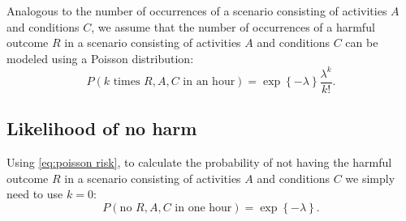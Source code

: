 Analogous to the number of occurrences of a scenario consisting of activities $A$ and conditions $C$, we assume that the number of occurrences of a harmful outcome $R$ in a scenario consisting of activities $A$ and conditions $C$ can be modeled using a Poisson distribution:
\begin{equation} \label{eq:poisson risk}
	P(k\text{ times }R,A,C\text{ in an hour}) = \exp \left\{ -\lambda \right\} \frac{\lambda^k}{k!}.
\end{equation}


\subsection{Likelihood of no harm}
\label{sec:no harm}

Using \cref{eq:poisson risk}, to calculate the probability of not having the harmful outcome $R$ in a scenario consisting of activities $A$ and conditions $C$ we simply need to use $k=0$:
\begin{equation} \label{eq:no harm}
	P(\text{no }R,A,C\text{ in one hour}) = \exp \left\{ -\lambda \right\}.
\end{equation}


